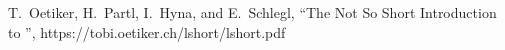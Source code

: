 
\begin{thebibliography}{99} %

T.~Oetiker, H.~Partl, I.~Hyna, and E.~Schlegl,
``The Not So Short Introduction to \LaTeXe'',
https://tobi.oetiker.ch/lshort/lshort.pdf

\end{thebibliography}







